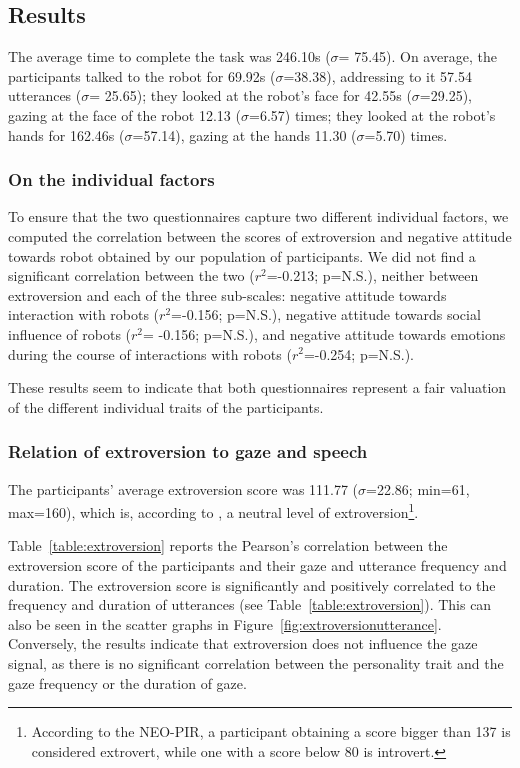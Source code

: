 \subsection{Results}

The average time to complete the task was 246.10s ($\sigma$= 75.45). 
On average, the participants talked to the robot for 69.92s ($\sigma$=38.38), addressing to it 57.54 utterances ($\sigma$= 25.65); they looked at the robot's face for 42.55s ($\sigma$=29.25), gazing at the face of the robot 12.13 ($\sigma$=6.57) times; they looked at the robot's hands for 162.46s ($\sigma$=57.14), gazing at the hands 11.30 ($\sigma$=5.70) times.


\subsubsection{On the individual factors}
To ensure that the two questionnaires capture two different individual factors, we computed the correlation between the scores of extroversion and negative attitude towards robot obtained by our population of participants.
We did not find a significant correlation between the two ($r^2$=-0.213; p=N.S.), neither between extroversion and  
each of the three sub-scales: negative attitude towards interaction with robots ($r^2$=-0.156; p=N.S.), negative attitude towards social influence of robots ($r^2$= -0.156; p=N.S.), and negative attitude towards emotions during the course of interactions with robots ($r^2$=-0.254; p=N.S.). 

These results seem to indicate that both questionnaires represent a fair valuation of the different individual traits of the participants. 


\subsubsection{Relation of extroversion to gaze and speech}\label{sec:extro}

The participants' average extroversion score was 111.77 ($\sigma$=22.86; min=61, max=160), which is, according to \cite{NEOPIR1998}, a neutral level of extroversion\footnote{According to the NEO-PIR, a participant obtaining a score bigger than 137 is considered extrovert, while one with a score below 80 is introvert.}. 

Table~\ref{table:extroversion} reports the Pearson's correlation between the extroversion score of the participants and their gaze and utterance frequency and duration. 
The extroversion score is significantly and positively correlated to the frequency and duration of utterances (see Table~\ref{table:extroversion}). This can also be seen in the scatter graphs in Figure~\ref{fig:extroversionutterance}.
Conversely, the results indicate that extroversion does not influence the gaze signal, as there is no significant correlation between the personality trait and the gaze frequency or the duration of gaze.

